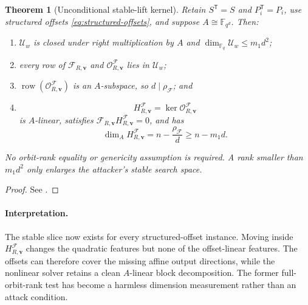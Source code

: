 \documentclass[11pt]{article}
\newtheorem{theorem}{Theorem}
\newcommand{\F}{\mathbb F}
\newcommand{\transpose}{\mathsf T}
\begin{document}
\begin{theorem}[Unconditional stable-lift kernel]\label{thm:stable-kernel}
Retain $S^\transpose=S$ and $P_i^\transpose=P_i$, use structured offsets
\eqref{eq:structured-offsets}, and suppose $A\cong\F_{q^d}$.  Then:
\begin{enumerate}[label=(\roman*)]
\item $\mathcal U_w$ is closed under right multiplication by $A$ and
$\dim_{\F_q}\mathcal U_w\le m_1d^2$;
\item every row of $\mathcal F_{R,\mathbf v}$ and
$\mathcal O^{\mathcal F}_{R,\mathbf v}$ lies in $\mathcal U_w$;
\item $\operatorname{row}(\mathcal O^{\mathcal F}_{R,\mathbf v})$ is an
$A$-subspace, so $d\mid\rho_{\mathcal F}$; and
\item
\begin{equation}\label{eq:automatic-stable-kernel}
 H^{\mathcal F}_{R,\mathbf v}
   =\ker\mathcal O^{\mathcal F}_{R,\mathbf v}
\end{equation}
is $A$-linear, satisfies
$\mathcal F_{R,\mathbf v}H^{\mathcal F}_{R,\mathbf v}=0$, and has
\begin{equation}\label{eq:automatic-stable-dimension}
 \dim_A H^{\mathcal F}_{R,\mathbf v}
   =n-\frac{\rho_{\mathcal F}}d
   \ge n-m_1d.
\end{equation}
\end{enumerate}
No orbit-rank equality or genericity assumption is required.  A rank smaller
than $m_1d^2$ only enlarges the attacker's stable search space.
\end{theorem}

\begin{proof}
See .
\end{proof}

\paragraph{Interpretation.}
The stable slice now exists for every structured-offset instance.  Moving
inside $H^{\mathcal F}_{R,\mathbf v}$ changes the quadratic features but none
of the offset-linear features.  The offsets can therefore cover the missing
affine output directions, while the nonlinear solver retains a clean
$A$-linear block decomposition.  The former full-orbit-rank test has become a
harmless dimension measurement rather than an attack condition.

\begin{center}
\end{center}
\end{document}
